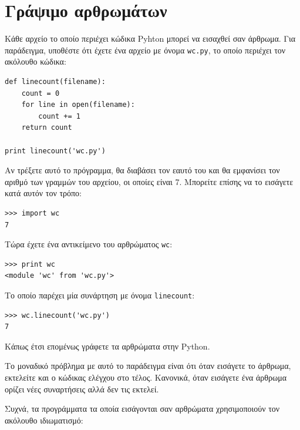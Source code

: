 \documentclass[10pt]{book}
\begin{document}
 
\section{Γράψιμο αρθρωμάτων}
\label{modules}

Κάθε αρχείο το οποίο περιέχει κώδικα Pyhton μπορεί να εισαχθεί σαν άρθρωμα. 
Για παράδειγμα, υποθέστε ότι έχετε ένα αρχείο με όνομα {\tt wc.py}, το οποίο περιέχει τον ακόλουθο κώδικα:

\begin{verbatim}
def linecount(filename):
    count = 0
    for line in open(filename):
        count += 1
    return count

print linecount('wc.py')
\end{verbatim}
%
Αν τρέξετε αυτό το πρόγραμμα, θα διαβάσει τον εαυτό του και θα εμφανίσει τον αριθμό 
των γραμμών του αρχείου, οι οποίες είναι 7. Μπορείτε επίσης να το εισάγετε κατά αυτόν τον τρόπο:

\begin{verbatim}
>>> import wc
7
\end{verbatim}
%
Τώρα έχετε ένα αντικείμενο του αρθρώματος {\tt wc}:

\begin{verbatim}
>>> print wc
<module 'wc' from 'wc.py'>
\end{verbatim}
%
Το οποίο παρέχει μία συνάρτηση με όνομα \verb"linecount":

\begin{verbatim}
>>> wc.linecount('wc.py')
7
\end{verbatim}
%
Κάπως έτσι επομένως γράφετε τα αρθρώματα στην Python.

Το μοναδικό πρόβλημα με αυτό το παράδειγμα είναι ότι όταν εισάγετε το άρθρωμα, εκτελείτε 
και ο κώδικας ελέγχου στο τέλος. Κανονικά, όταν εισάγετε ένα άρθρωμα ορίζει νέες συναρτήσεις αλλά δεν τις εκτελεί.

Συχνά, τα προγράμματα τα οποία εισάγονται σαν αρθρώματα χρησιμοποιούν τον ακόλουθο ιδιωματισμό:
\end{document}
